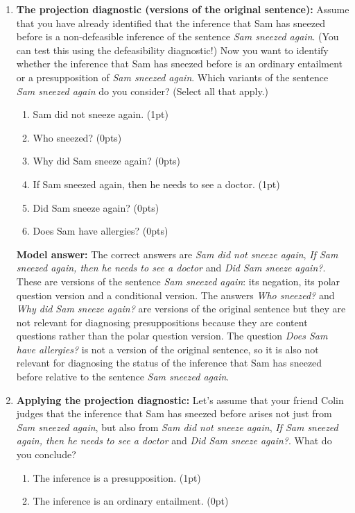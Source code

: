 \documentclass[a4,11pt]{article}
\begin{document}
\begin{enumerate}[leftmargin = 12pt]
 \item {\bf The projection diagnostic (versions of the original sentence):} Assume that you have already identified that the inference that Sam has sneezed before is a non-defeasible inference of the sentence {\em Sam sneezed again}. (You can test this using the defeasibility diagnostic!) Now you want to identify whether the inference that Sam has sneezed before is an ordinary entailment or a presupposition of {\em Sam sneezed again}. Which variants of the sentence {\em Sam sneezed again} do you consider? (Select all that apply.)
 
    \begin{enumerate}[noitemsep]
        \item Sam did not sneeze again. (1pt)
         \item Who sneezed? (0pts)
           \item Why did Sam sneeze again? (0pts)
           \item If Sam sneezed again, then he needs to see a doctor. (1pt)
           \item Did Sam sneeze again? (0pts)
           \item Does Sam have allergies? (0pts)
    \end{enumerate}
  
{\bf Model answer:}  The correct answers are {\em Sam did not sneeze again}, {\em If Sam sneezed again, then he needs to see a doctor} and {\em Did Sam sneeze again?}. These are versions of the sentence {\em Sam sneezed again}: its negation, its polar question version and a conditional version. The answers {\em Who sneezed?} and {\em  Why did Sam sneeze again?} are versions of the original sentence but they are not relevant for diagnosing presuppositions because they are content questions rather than the polar question version. The question {\em Does Sam have allergies?} is not a version of the original sentence, so it is also not relevant for diagnosing the status of the inference that Sam has sneezed before relative to the sentence {\em Sam sneezed again}.
  
  \item {\bf Applying the projection diagnostic:} Let's assume that your friend Colin judges that the inference that Sam has sneezed before arises not just from {\em Sam sneezed again}, but also from {\em Sam did not sneeze again}, {\em If Sam sneezed again, then he needs to see a doctor} and {\em Did Sam sneeze again?}. What do you conclude?
   
    \begin{enumerate}[noitemsep]
        \item The inference is a presupposition. (1pt)
 	\item The inference is an ordinary entailment. (0pt)
    \end{enumerate}
  

\end{enumerate}
\end{document}
